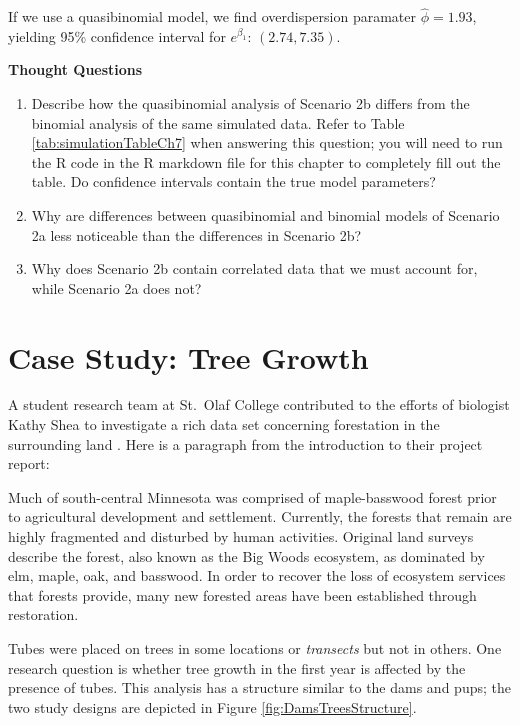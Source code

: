 \documentclass[
]{krantz}
\renewenvironment{quote}{\begin{VF}}{\end{VF}}
\begin{document}
If we use a quasibinomial model, we find overdispersion paramater \(\widehat{\phi} = 1.93\), yielding 95\% confidence interval for \(e^{\beta_1}\): \((2.74, 7.35)\).

\vspace{5mm}

\textbf{Thought Questions}

\begin{enumerate}
\def\labelenumi{\arabic{enumi}.}
\setcounter{enumi}{8}
\item
  Describe how the quasibinomial analysis of Scenario 2b differs from the binomial analysis of the same simulated data. Refer to Table \ref{tab:simulationTableCh7} when answering this question; you will need to run the R code in the R markdown file for this chapter to completely fill out the table. Do confidence intervals contain the true model parameters?
\item
  Why are differences between quasibinomial and binomial models of Scenario 2a less noticeable than the differences in Scenario 2b?
\item
  Why does Scenario 2b contain correlated data that we must account for, while Scenario 2a does not?
\end{enumerate}

\hypertarget{case-study-tree-growth}{%
\section{Case Study: Tree Growth}\label{case-study-tree-growth}}

A student research team at St.~Olaf College contributed to the efforts of biologist Kathy Shea to investigate a rich data set concerning forestation in the surrounding land \citep{Eisinger2011}. Here is a paragraph from the introduction to their project report:

\begin{quote}
Much of south-central Minnesota was comprised of maple-basswood forest prior to agricultural development and settlement. Currently, the forests that remain are highly fragmented and disturbed by human activities. Original land surveys describe the forest, also known as the Big Woods ecosystem, as dominated by elm, maple, oak, and basswood. In order to recover the loss of ecosystem services that forests provide, many new forested areas have been established through restoration.
\end{quote}

Tubes were placed on trees in some locations or \emph{transects} but not in others. One research question is whether tree growth in the first year is affected by the presence of tubes. This analysis has a structure similar to the dams and pups; the two study designs are depicted in Figure \ref{fig:DamsTreesStructure}.
\end{document}
